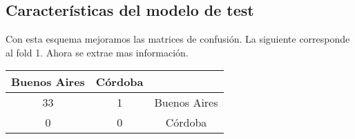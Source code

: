 \subsection{Características del modelo de test}

Con esta esquema mejoramos las matrices de confusión. La siguiente corresponde al fold 1. Ahora se extrae mas información.	

\begin{table}[H]
	\centering
	\begin{tabular}{|c|c|c|}
		\hline
		Buenos Aires & Córdoba & \\ \hline
		33 & 1 & Buenos Aires\\ \hline
		0 & 0 & Córdoba\\ \hline
	\end{tabular}
\end{table}

